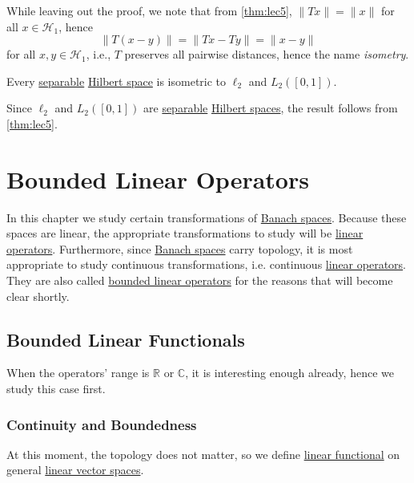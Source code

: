 While leaving out the proof, we note that from \autoref{thm:lec5}, \(\lVert Tx \rVert = \lVert x \rVert \) for all \(x\in \mathcal{H} _1\), hence
\[
	\lVert T(x-y) \rVert
	= \lVert Tx - Ty \rVert
	= \lVert x - y \rVert
\]
for all \(x, y\in \mathcal{H} _1\), i.e., \(T\) preserves all pairwise distances, hence the name \emph{isometry}.

\begin{remark}
	Every \hyperref[def:separable]{separable} \hyperref[def:Hilbert-space]{Hilbert space} is isometric to \(\ell _2\) and \(L_2([0, 1])\).
\end{remark}
\begin{explanation}
	Since \(\ell _2\) and \(L_2([0, 1])\) are \hyperref[def:separable]{separable} \hyperref[def:Hilbert-space]{Hilbert spaces}, the result follows from \autoref{thm:lec5}.
\end{explanation}

\chapter{Bounded Linear Operators}
In this chapter we study certain transformations of \hyperref[def:Banach-space]{Banach spaces}. Because these spaces are linear, the appropriate transformations to study will be \hyperref[def:linear-op]{linear operators}. Furthermore, since \hyperref[def:Banach-space]{Banach spaces} carry topology, it is most appropriate to study continuous transformations, i.e. continuous \hyperref[def:linear-op]{linear operators}. They are also called \hyperref[def:bounded-linear-op]{bounded linear operators} for the reasons that will become clear shortly.

\section{Bounded Linear Functionals}
When the operators' range is \(\mathbb{R} \) or \(\mathbb{C} \), it is interesting enough already, hence we study this case first.

\subsection{Continuity and Boundedness}
At this moment, the topology does not matter, so we define \hyperref[def:linear-functional]{linear functional} on general \hyperref[def:linear-vector-space]{linear vector spaces}.

